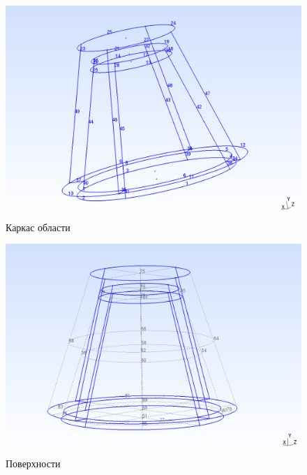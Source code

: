 \documentclass[a4paper, 14pt]{extreport}
\begin{document}
\begin{figure}[H]
	\center
	\includegraphics[scale=0.35]{pictures/skeleton.png}
	\caption{Каркас области}
	\label{fig: skeleton}
\end{figure}


\begin{figure}[H]
	\center
	\includegraphics[scale=0.35]{pictures/surfaces.png}
	\caption{Поверхности}
	\label{fig: surfaces}
\end{figure}
\end{document}
